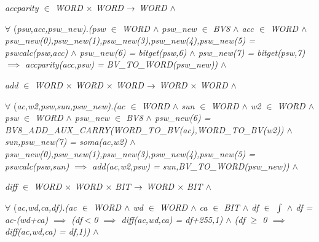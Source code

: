 \begin{sloppypar}
\hspace*{0.10in}\it accparity $\in$  \it WORD $\times$ \it WORD  $\rightarrow$  \it WORD  $\land$ 

\hspace*{0.10in} $\forall$ \rm (\it psw\rm ,\it acc\rm ,\it psw\_new\rm )\rm .\rm (\it psw $\in$  \it WORD  $\land$  \it psw\_new $\in$  \it BV8  $\land$  \it acc $\in$  \it WORD  $\land$  \it psw\_new\rm (\rm 0\rm )\rm ,\it psw\_new\rm (\rm 1\rm )\rm ,\it psw\_new\rm (\rm 3\rm )\rm ,\it psw\_new\rm (\rm 4\rm )\rm ,\it psw\_new\rm (\rm 5\rm ) \rm = \it pswcalc\rm (\it psw\rm ,\it acc\rm )  $\land$  \it psw\_new\rm (\rm 6\rm ) \rm = \it bitget\rm (\it psw\rm ,\rm 6\rm )  $\land$  \it psw\_new\rm (\rm 7\rm ) \rm = \it bitget\rm (\it psw\rm ,\rm 7\rm )  $\implies$  \it accparity\rm (\it acc\rm ,\it psw\rm ) \rm = \it BV\_TO\_WORD\rm (\it psw\_new\rm )\rm )  $\land$ 

\hspace*{0.10in}\it add $\in$  \it WORD $\times$ \it WORD $\times$ \it WORD  $\rightarrow$  \it WORD $\times$ \it WORD  $\land$ 

\hspace*{0.10in} $\forall$ \rm (\it ac\rm ,\it w2\rm ,\it psw\rm ,\it sun\rm ,\it psw\_new\rm )\rm .\rm (\it ac $\in$  \it WORD  $\land$  \it sun $\in$  \it WORD  $\land$  \it w2 $\in$  \it WORD  $\land$  \it psw $\in$  \it WORD  $\land$  \it psw\_new $\in$  \it BV8  $\land$  \it psw\_new\rm (\rm 6\rm ) \rm = \it BV8\_ADD\_AUX\_CARRY\rm (\it WORD\_TO\_BV\rm (\it ac\rm )\rm ,\it WORD\_TO\_BV\rm (\it w2\rm )\rm )  $\land$  \it sun\rm ,\it psw\_new\rm (\rm 7\rm ) \rm = \it soma\rm (\it ac\rm ,\it w2\rm )  $\land$  \it psw\_new\rm (\rm 0\rm )\rm ,\it psw\_new\rm (\rm 1\rm )\rm ,\it psw\_new\rm (\rm 3\rm )\rm ,\it psw\_new\rm (\rm 4\rm )\rm ,\it psw\_new\rm (\rm 5\rm ) \rm = \it pswcalc\rm (\it psw\rm ,\it sun\rm )  $\implies$  \it add\rm (\it ac\rm ,\it w2\rm ,\it psw\rm ) \rm = \it sun\rm ,\it BV\_TO\_WORD\rm (\it psw\_new\rm )\rm )  $\land$ 

\hspace*{0.10in}\it diff $\in$  \it WORD $\times$ \it WORD $\times$ \it BIT  $\rightarrow$  \it WORD $\times$ \it BIT  $\land$ 

\hspace*{0.10in} $\forall$ \rm (\it ac\rm ,\it wd\rm ,\it ca\rm ,\it df\rm )\rm .\rm (\it ac $\in$  \it WORD  $\land$  \it wd $\in$  \it WORD  $\land$  \it ca $\in$  \it BIT  $\land$  \it df $\in$   $\int$   $\land$  \it df \rm = \it ac\rm -\rm (\it wd\rm +\it ca\rm )  $\implies$  \rm (\it df$<$\rm 0  $\implies$  \it diff\rm (\it ac\rm ,\it wd\rm ,\it ca\rm ) \rm = \it df\rm +\rm 2\rm 5\rm 5\rm ,\rm 1\rm )  $\land$  \rm (\it df $\geq$ \rm 0  $\implies$  \it diff\rm (\it ac\rm ,\it wd\rm ,\it ca\rm ) \rm = \it df\rm ,\rm 1\rm )\rm )  $\land$ 


\end{sloppypar}
